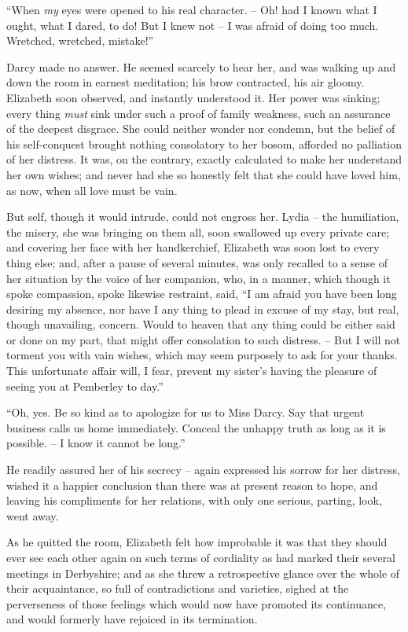 “When \textit{my} eyes were opened to his real character. -- Oh!
had I known what I ought, what I dared, to do!
But I knew not -- I was afraid of doing too much.
Wretched, wretched, mistake!”

Darcy made no answer. He seemed scarcely to hear
her, and was walking up and down the room in earnest
meditation; his brow contracted, his air gloomy. Elizabeth
soon observed, and instantly understood it. Her power
was sinking; every thing \textit{must} sink under such a proof
of family weakness, such an assurance of the deepest
disgrace. She could neither wonder nor condemn, but the
belief of his self-conquest brought nothing consolatory to
her bosom, afforded no palliation of her distress. It was,
on the contrary, exactly calculated to make her understand
her own wishes; and never had she so honestly felt that
she could have loved him, as now, when all love must
be vain.

But self, though it would intrude, could not engross
her. Lydia -- the humiliation, the misery, she was bringing
on them all, soon swallowed up every private care; and
covering her face with her handkerchief, Elizabeth was
soon lost to every thing else; and, after a pause of several
minutes, was only recalled to a sense of her situation by
the voice of her companion, who, in a manner, which
though it spoke compassion, spoke likewise restraint, said,
“I am afraid you have been long desiring my absence,
nor have I any thing to plead in excuse of my stay, but
real, though unavailing, concern. Would to heaven that
any thing could be either said or done on my part, that
might offer consolation to such distress. -- But I will not
torment you with vain wishes, which may seem purposely
to ask for your thanks. This unfortunate affair will,
I fear, prevent my sister’s having the pleasure of seeing
you at Pemberley to day.”

“Oh, yes. Be so kind as to apologize for us to Miss
Darcy. Say that urgent business calls us home immediately.
Conceal the unhappy truth as long as it is possible. -- I
know it cannot be long.”

He readily assured her of his secrecy -- again expressed
his sorrow for her distress, wished it a happier conclusion
than there was at present reason to hope, and leaving
his compliments for her relations, with only one serious,
parting, look, went away.

As he quitted the room, Elizabeth felt how improbable
it was that they should ever see each other again on such
terms of cordiality as had marked their several meetings
in Derbyshire; and as she threw a retrospective glance
over the whole of their acquaintance, so full of contradictions
and varieties, sighed at the perverseness of those
feelings which would now have promoted its continuance,
and would formerly have rejoiced in its termination.

